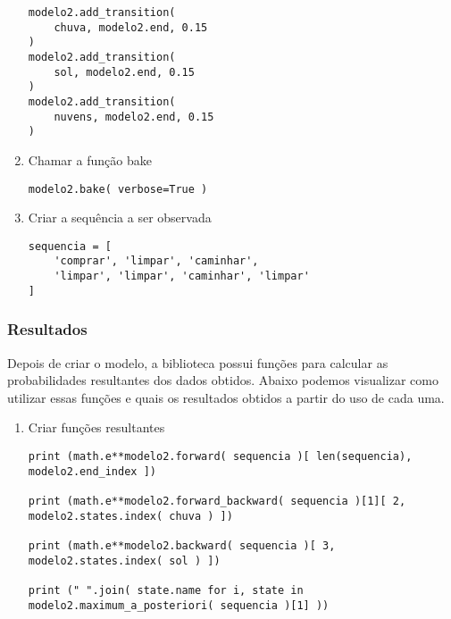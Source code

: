 \documentclass{article}
\begin{document}
\begin{enumerate}
\begin{verbatim}
modelo2.add_transition(
    chuva, modelo2.end, 0.15
)
modelo2.add_transition(
    sol, modelo2.end, 0.15 
)
modelo2.add_transition(
    nuvens, modelo2.end, 0.15 
)
\end{verbatim}

\item Chamar a função bake
\begin{verbatim}
modelo2.bake( verbose=True )
\end{verbatim}

\item Criar a sequência a ser observada
\begin{verbatim}
sequencia = [
    'comprar', 'limpar', 'caminhar', 
    'limpar', 'limpar', 'caminhar', 'limpar'
]
\end{verbatim}

\end{enumerate}
 
 
\subsubsection{Resultados}
Depois de criar o modelo, a biblioteca possui funções para calcular as probabilidades resultantes dos dados obtidos. Abaixo podemos visualizar como utilizar essas funções e quais os resultados obtidos a partir do uso de cada uma.

\begin{enumerate}
    
\item Criar funções resultantes
\begin{verbatim}
print (math.e**modelo2.forward( sequencia )[ len(sequencia), modelo2.end_index ]) 

print (math.e**modelo2.forward_backward( sequencia )[1][ 2, modelo2.states.index( chuva ) ]) 

print (math.e**modelo2.backward( sequencia )[ 3, modelo2.states.index( sol ) ]) 

print (" ".join( state.name for i, state in modelo2.maximum_a_posteriori( sequencia )[1] )) 
\end{verbatim}

\end{enumerate}
 
\end{document}
